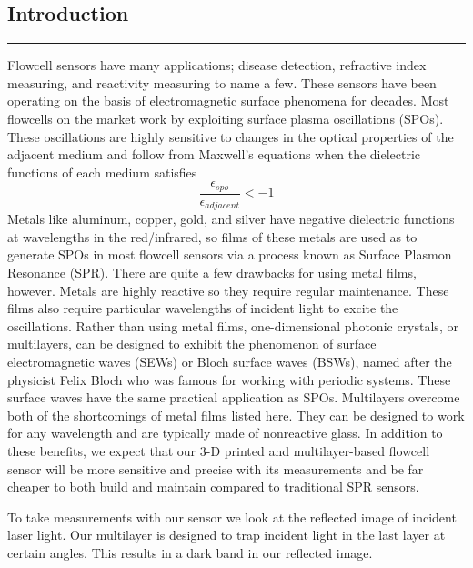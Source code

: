 \documentclass{report}
\begin{document}
	\selectfont
    \begin{flushleft}
    \section*{Introduction}
    \vspace{-0.1cm}\hrule\vspace{0.2cm}
    \par{Flowcell sensors have many applications; disease detection, refractive index measuring, and reactivity measuring to name a few. These sensors have been operating on the basis of electromagnetic surface phenomena for decades. Most flowcells on the market work by exploiting surface plasma oscillations (SPOs). These oscillations are highly sensitive to changes in the optical properties of the adjacent medium and follow from Maxwell's equations when the dielectric functions of each medium satisfies
    \[
        \frac{\epsilon_{spo}}{\epsilon_{adjacent}} < -1
    \]
		Metals like aluminum, copper, gold, and silver have negative dielectric functions at wavelengths in the red/infrared, so films of these metals are used as to generate SPOs in most flowcell sensors via a process known as Surface Plasmon Resonance (SPR). There are quite a few drawbacks for using metal films, however. Metals are highly reactive so they require regular maintenance. These films also require particular wavelengths of incident light to excite the oscillations. Rather than using metal films, one-dimensional photonic crystals, or multilayers, can be designed to exhibit the phenomenon of surface electromagnetic waves (SEWs) or Bloch surface waves (BSWs), named after the physicist Felix Bloch who was famous for working with periodic systems. These surface waves have the same practical application as SPOs. Multilayers overcome both of the shortcomings of metal films listed here. They can be designed to work for any wavelength and are typically made of nonreactive glass. In addition to these benefits, we expect that our 3-D printed and multilayer-based flowcell sensor will be more sensitive and precise with its measurements and be far cheaper to both build and maintain compared to traditional SPR sensors.}
	\par{To take measurements with our sensor we look at the reflected image of incident laser light. Our multilayer is designed to trap incident light in the last layer at certain angles. This results in a dark band in our reflected image.}
	\end{flushleft}
\end{document}
